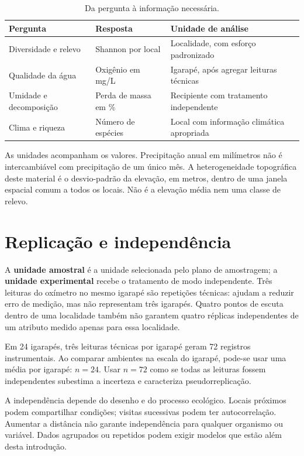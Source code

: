 \begin{table}[H]\centering\small
\caption{Da pergunta à informação necessária.}
\begin{tabular}{p{.27\linewidth}p{.28\linewidth}p{.35\linewidth}}
\toprule Pergunta & Resposta & Unidade de análise\\\midrule
Diversidade e relevo & Shannon por local & Localidade, com esforço padronizado\\
Qualidade da água & Oxigênio em mg/L & Igarapé, após agregar leituras técnicas\\
Umidade e decomposição & Perda de massa em \% & Recipiente com tratamento independente\\
Clima e riqueza & Número de espécies & Local com informação climática apropriada\\\bottomrule
\end{tabular}\end{table}

As unidades acompanham os valores. Precipitação anual em milímetros não é intercambiável com precipitação de um único mês. A heterogeneidade topográfica deste material é o desvio-padrão da elevação, em metros, dentro de uma janela espacial comum a todos os locais. Não é a elevação média nem uma classe de relevo.

\section{Replicação e independência}
A \textbf{unidade amostral} é a unidade selecionada pelo plano de amostragem; a \textbf{unidade experimental} recebe o tratamento de modo independente. Três leituras do oxímetro no mesmo igarapé são repetições técnicas: ajudam a reduzir erro de medição, mas não representam três igarapés. Quatro pontos de escuta dentro de uma localidade também não garantem quatro réplicas independentes de um atributo medido apenas para essa localidade.

\begin{exemplo}
Em 24 igarapés, três leituras técnicas por igarapé geram 72 registros instrumentais. Ao comparar ambientes na escala do igarapé, pode-se usar uma média por igarapé: $n=24$. Usar $n=72$ como se todas as leituras fossem independentes subestima a incerteza e caracteriza pseudorreplicação.
\end{exemplo}

A independência depende do desenho e do processo ecológico. Locais próximos podem compartilhar condições; visitas sucessivas podem ter autocorrelação. Aumentar a distância não garante independência para qualquer organismo ou variável. Dados agrupados ou repetidos podem exigir modelos que estão além desta introdução.

